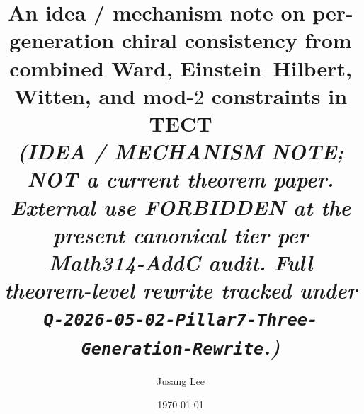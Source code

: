 



\title{An idea / mechanism note on per-generation chiral consistency
from combined Ward, Einstein--Hilbert, Witten, and mod-$2$ constraints
in TECT \\
\normalsize{\textit{(IDEA / MECHANISM NOTE; NOT a current theorem
paper. External use FORBIDDEN at the present canonical tier per
Math314-AddC audit. Full theorem-level rewrite tracked under
\texttt{Q-2026-05-02-Pillar7-Three-Generation-Rewrite}.)}}}

\author{Jusang Lee}

\date{\today}

